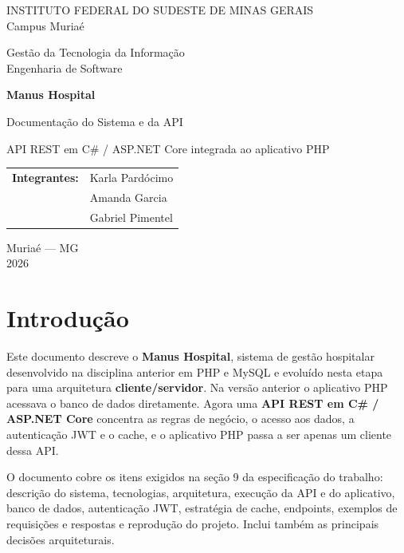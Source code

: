 \documentclass[12pt,a4paper]{article}
\begin{document}
\begin{titlepage}
  \centering
  {\large INSTITUTO FEDERAL DO SUDESTE DE MINAS GERAIS\\ Campus Muriaé\par}
  \vspace{0.5cm}
  {\large Gestão da Tecnologia da Informação\\ Engenharia de Software\par}
  \vfill
  {\Huge\bfseries\color{azul} Manus Hospital\par}
  \vspace{0.4cm}
  {\LARGE Documentação do Sistema e da API\par}
  \vspace{0.4cm}
  {\large API REST em C\# / ASP.NET Core integrada ao aplicativo PHP\par}
  \vfill
  \begin{tabular}{ll}
    \textbf{Integrantes:} & Karla Pardócimo \\
                          & Amanda Garcia \\
                          & Gabriel Pimentel \\
  \end{tabular}
  \vfill
  {\large Muriaé — MG\\ 2026\par}
\end{titlepage}

\tableofcontents
\newpage

\section{Introdução}

Este documento descreve o \textbf{Manus Hospital}, sistema de gestão hospitalar desenvolvido na
disciplina anterior em PHP e MySQL e evoluído nesta etapa para uma arquitetura
\textbf{cliente/servidor}. Na versão anterior o aplicativo PHP acessava o banco de dados
diretamente. Agora uma \textbf{API REST em C\# / ASP.NET Core} concentra as regras de negócio,
o acesso aos dados, a autenticação JWT e o cache, e o aplicativo PHP passa a ser apenas um
cliente dessa API.

O documento cobre os itens exigidos na seção 9 da especificação do trabalho: descrição do
sistema, tecnologias, arquitetura, execução da API e do aplicativo, banco de dados,
autenticação JWT, estratégia de cache, endpoints, exemplos de requisições e respostas e
reprodução do projeto. Inclui também as principais decisões arquiteturais.
\end{document}
